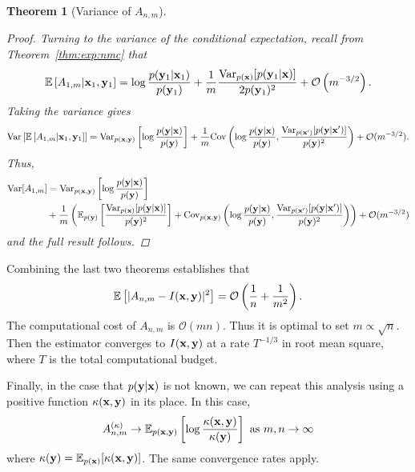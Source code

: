 \documentclass[a4paper, 10pt]{report}
\theoremstyle{plain}
\newtheorem{theorem}{Theorem}[chapter]
\begin{document}
\begin{theorem}[Variance of $A_{n,m}$]
\begin{proof}
			
			Turning to the variance of the conditional expectation, recall from Theorem~\ref{thm:exp:nmc} that
			\begin{equation}
			\mathbb{E}\left[ A_{1,m} | {\mathbf{x}}_1,{\mathbf{y}}_1 \right] = \log \frac{p({\mathbf{y}}_1|{\mathbf{x}}_1)}{p({\mathbf{y}}_1)} + \frac{1}{m}\frac{\mathrm{Var}_{p({\mathbf{x}})}[p({\mathbf{y}}_1|{\mathbf{x}})]}{2p({\mathbf{y}}_1)^2} + \mathcal{O}\left( m^{-3/2} \right).
			\end{equation}
			Taking the variance gives
			\begin{equation}
			\mathrm{Var}\left[ \mathbb{E}\left[ A_{1,m} | {\mathbf{x}}_1,{\mathbf{y}}_1 \right]  \right] = \mathrm{Var}_{p({\mathbf{x}},{\mathbf{y}})}\left[ \log \frac{p({\mathbf{y}}|{\mathbf{x}})}{p({\mathbf{y}})} \right] + \frac{1}{m} \mathrm{Cov}\left(\log \frac{p({\mathbf{y}}|{\mathbf{x}})}{p({\mathbf{y}})}, \frac{\mathrm{Var}_{p({\mathbf{x}}')}[p({\mathbf{y}}|{\mathbf{x}}')]}{p({\mathbf{y}})^2}  \right) + \mathcal{O}(m^{-3/2}).
			\end{equation}
			Thus,
			\begin{equation}
			\begin{split}
			\mathrm{Var}[A_{1,m}] &= \mathrm{Var}_{p({\mathbf{x}},{\mathbf{y}})}\left[ \log \frac{p({\mathbf{y}}|{\mathbf{x}})}{p({\mathbf{y}})} \right]
			\\ & + \frac{1}{m} \left(\mathbb{E}_{p({\mathbf{y}})}\left[\frac{\mathrm{Var}_{p({\mathbf{x}})}[p({\mathbf{y}}|{\mathbf{x}})]}{p({\mathbf{y}})^2} \right] + \mathrm{Cov}_{p({\mathbf{x}},{\mathbf{y}})}\left(\log \frac{p({\mathbf{y}}|{\mathbf{x}})}{p({\mathbf{y}})}, \frac{\mathrm{Var}_{p({\mathbf{x}}')}[p({\mathbf{y}}|{\mathbf{x}}')]}{p({\mathbf{y}})^2}  \right) \right) + \mathcal{O}(m^{-3/2})
			\end{split}
			\end{equation}
			and the full result follows.
		\end{proof}
	\end{theorem}
	Combining the last two theorems establishes that
	\begin{equation}
	\mathbb{E}\left[| A_{n,m} - I({\mathbf{x}},{\mathbf{y}}) |^2\right] = \mathcal{O}\left(\frac{1}{n} + \frac{1}{m^2} \right).
	\end{equation}
	The computational cost of $A_{n,m}$ is $\mathcal{O}(mn)$.  Thus it is optimal to set $m \propto \sqrt{n}$. Then the estimator converges to $I({\mathbf{x}},{\mathbf{y}})$ at a rate $T^{-1/3}$ in root mean square, where $T$ is the total computational budget.
	
	Finally, in the case that $p({\mathbf{y}}|{\mathbf{x}})$ is not known, we can repeat this analysis using a positive function $\kappa({\mathbf{x}},{\mathbf{y}})$ in its place.
	In this case,
	\begin{equation}
	A^{(\kappa)}_{n,m} \to \mathbb{E}_{p({\mathbf{x}},{\mathbf{y}})} \left[ \log\frac{\kappa({\mathbf{x}},{\mathbf{y}})}{\kappa({\mathbf{y}})} \right] \text{ as } m,n\to\infty
	\end{equation}
	where $\kappa({\mathbf{y}}) = \mathbb{E}_{p({\mathbf{x}})}[\kappa({\mathbf{x}},{\mathbf{y}})]$. The same convergence rates apply.
	
\end{document}
